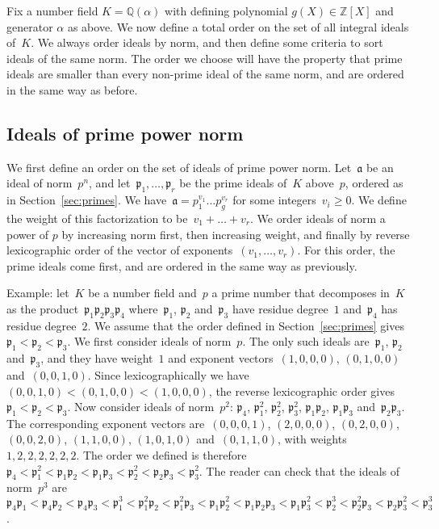 \documentclass{article}
\def\Z{{\mathbb Z}}
\def\Q{{\mathbb Q}}
\def\a{{\mathfrak a}}
\def\p{{\mathfrak p}}
\begin{document}
Fix a number field $K=\Q(\alpha)$ with defining polynomial
$g(X)\in\Z[X]$ and generator $\alpha$ as above. 
We now define a total order on the set of all integral ideals of~$K$.
We always order ideals by norm, and then define some criteria to sort ideals of
the same norm. The order we choose will have the property that prime ideals are
smaller than every non-prime ideal of the same norm, and are ordered in the same
way as before.

\subsection{Ideals of prime power norm}\label{sec:primepowernorm}

We first define an order on the set of ideals of prime power norm. Let~$\a$ be
an ideal of norm~$p^n$, and let~$\p_1,\dots,\p_r$ be the prime ideals of~$K$
above~$p$, ordered as in Section~\ref{sec:primes}. We have~$\a = p_1^{v_1}\dots
p_g^{v_r}$ for some integers~$v_i\ge 0$. We define the weight of this
factorization to be~$v_1+\dots+v_r$. We order ideals of norm a power of $p$ by
increasing norm first, then increasing weight, and finally by reverse
lexicographic order of the vector of exponents~$(v_1,\dots,v_r)$. For this
order, the prime ideals come first, and are ordered in the same way as
previously.

Example: let~$K$ be a number field and~$p$ a prime number that decomposes in~$K$
as the product~$\p_1\p_2\p_3\p_4$ where~$\p_1$, $\p_2$ and~$\p_3$ have residue
degree~$1$ and~$\p_4$ has residue degree~$2$. We assume that the order defined
in Section~\ref{sec:primes} gives~$\p_1 < \p_2 < \p_3$. We first consider ideals
of norm~$p$. The only such ideals are~$\p_1$, $\p_2$ and~$\p_3$, and they have weight~$1$
and exponent vectors~$(1,0,0,0)$, $(0,1,0,0)$ and~$(0,0,1,0)$. Since
lexicographically we have~$(0,0,1,0)<(0,1,0,0)<(1,0,0,0)$, the reverse
lexicographic order gives~$\p_1<\p_2<\p_3$. Now
consider ideals of norm~$p^2$: $\p_4$, $\p_1^2$, $\p_2^2$, $\p_3^2$, $\p_1\p_2$,
$\p_1\p_3$ and~$\p_2\p_3$. The corresponding exponent vectors are~$(0,0,0,1)$,
$(2,0,0,0)$, $(0,2,0,0)$, $(0,0,2,0)$, $(1,1,0,0)$, $(1,0,1,0)$ and~$(0,1,1,0)$,
with weights~$1,2,2,2,2,2,2$. The order we defined is therefore~$\p_4 < \p_1^2 <
\p_1\p_2 < \p_1\p_3 < \p_2^2 < \p_2\p_3 < \p_3^2$. The reader can check that the
ideals of norm~$p^3$ are~$\p_4\p_1 < \p_4\p_2 < \p_4\p_3 < \p_1^3 < \p_1^2\p_2 <
\p_1^2\p_3 < \p_1\p_2^2 < \p_1\p_2\p_3 < \p_1\p_3^2 < \p_2^3 < \p_2^2\p_3 <
\p_2\p_3^2 < \p_3^3$.
\end{document}
